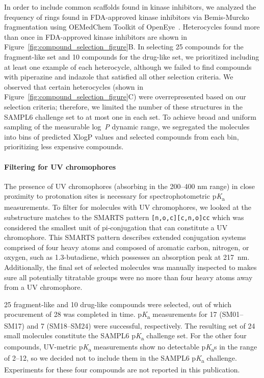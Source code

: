 \documentclass[9pt,lineno]{elife}
\newcommand{\pKa}{p\textit{K}\textsubscript{a}}
\newcommand{\logP}{log~\textit{P}}
\begin{document}
In order to include common scaffolds found in kinase inhibitors, we analyzed the frequency of rings found in FDA-approved kinase inhibitors via Bemis-Murcko fragmentation using OEMedChem Toolkit of OpenEye~\citep{bemis_properties_1996, oemedchemtk_openeye_2017}. Heterocycles found more than once in FDA-approved kinase inhibitors are shown in Figure~\ref{fig:compound_selection_figure}B. 
In selecting 25 compounds for the fragment-like set and 10 compounds for the drug-like set, we prioritized including at least one example of each heterocycle, although we failed to find compounds with piperazine and indazole that satisfied all other selection criteria. 
We observed that certain heterocycles (shown in Figure~\ref{fig:compound_selection_figure}C) were overrepresented based on our selection criteria; therefore, we limited the number of these structures in the SAMPL6 challenge set to at most one in each set.
To achieve broad and uniform sampling of the measurable \logP{} dynamic range, we segregated the molecules into bins of predicted XlogP values and selected compounds from each bin, prioritizing less expensive compounds. 

\paragraph{Filtering for UV chromophores}

The presence of UV chromophores (absorbing in the 200--400 nm range) in close proximity to protonation sites is necessary for spectrophotometric \pKa{} measurements. 
To filter for molecules with UV chromophores, we looked at the substructure matches to the SMARTS pattern \texttt{[n,o,c][c,n,o]cc} which was considered the smallest unit of pi-conjugation that can constitute a UV chromophore. 
This SMARTS pattern describes extended conjugation systems comprised of four heavy atoms and composed of aromatic carbon, nitrogen, or oxygen, such as 1.3-butadiene, which possesses an absorption peak at 217~nm. 
Additionally, the final set of selected molecules was manually inspected to makes sure all potentially titratable groups were no more than four heavy atoms away from a UV chromophore.

25 fragment-like and 10 drug-like compounds were selected, out of which procurement of 28 was completed in time. \pKa{} measurements for 17 (SM01--SM17) and 7 (SM18--SM24) were successful, respectively. 
The resulting set of 24 small molecules constitute the SAMPL6 \pKa{} challenge set.
For the other four compounds, UV-metric \pKa{} measurements show no detectable \pKa{}s in the range of 2--12, so we decided not to include them in the SAMPL6 \pKa{} challenge. 
Experiments for these four compounds are not reported in this publication. 
\end{document}
